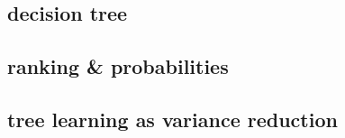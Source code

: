 \documentclass[cheatsheet.tex]{subfiles}
\begin{document}
\subsection{decision tree}
\lipsum[2-4]
\subsection{ranking \& probabilities}
\lipsum[2-4]
\subsection{tree learning as variance reduction}
\lipsum[2-4]
\end{document}
